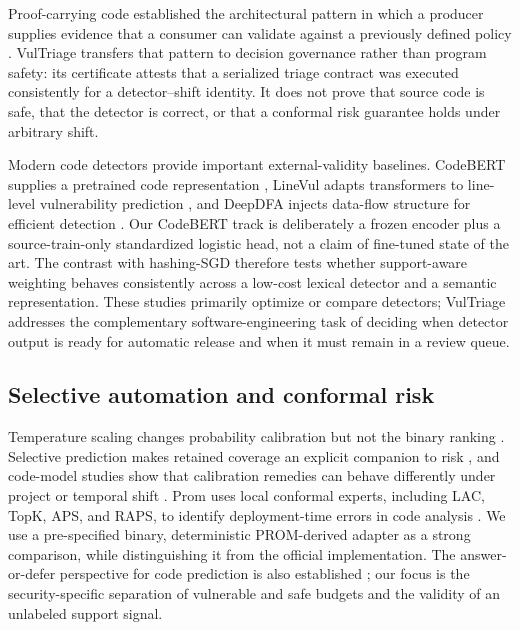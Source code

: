 \documentclass[preprint,12pt]{elsarticle}
\newcommand{\method}{VulTriage\xspace}
\begin{document}
Proof-carrying code established the architectural pattern in which a producer supplies evidence that a consumer can validate against a previously defined policy \cite{necula1997pcc}. \method transfers that pattern to decision governance rather than program safety: its certificate attests that a serialized triage contract was executed consistently for a detector--shift identity. It does not prove that source code is safe, that the detector is correct, or that a conformal risk guarantee holds under arbitrary shift.

Modern code detectors provide important external-validity baselines. CodeBERT supplies a pretrained code representation \cite{feng2020codebert}, LineVul adapts transformers to line-level vulnerability prediction \cite{fu2022linevul}, and DeepDFA injects data-flow structure for efficient detection \cite{steenhoek2024deepdfa}. Our CodeBERT track is deliberately a frozen encoder plus a source-train-only standardized logistic head, not a claim of fine-tuned state of the art. The contrast with hashing-SGD therefore tests whether support-aware weighting behaves consistently across a low-cost lexical detector and a semantic representation. These studies primarily optimize or compare detectors; \method addresses the complementary software-engineering task of deciding when detector output is ready for automatic release and when it must remain in a review queue.

\subsection{Selective automation and conformal risk}

Temperature scaling changes probability calibration but not the binary ranking \cite{guo2017calibration}. Selective prediction makes retained coverage an explicit companion to risk \cite{geifman2019selectivenet}, and code-model studies show that calibration remedies can behave differently under project or temporal shift \cite{zhou2024calibration,li2021shift}. Prom uses local conformal experts, including LAC, TopK, APS, and RAPS, to identify deployment-time errors in code analysis \cite{wang2025prom}. We use a pre-specified binary, deterministic PROM-derived adapter as a strong comparison, while distinguishing it from the official implementation. The answer-or-defer perspective for code prediction is also established \cite{rathnasuriya2026defer}; our focus is the security-specific separation of vulnerable and safe budgets and the validity of an unlabeled support signal.
\end{document}

